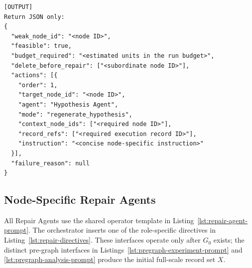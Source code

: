 \begin{lstlisting}
[OUTPUT]
Return JSON only:
{
  "weak_node_id": "<node ID>",
  "feasible": true,
  "budget_required": "<estimated units in the run budget>",
  "delete_before_repair": ["<subordinate node ID>"],
  "actions": [{
    "order": 1,
    "target_node_id": "<node ID>",
    "agent": "Hypothesis Agent",
    "mode": "regenerate_hypothesis",
    "context_node_ids": ["<required node ID>"],
    "record_refs": ["<required execution record ID>"],
    "instruction": "<concise node-specific instruction>"
  }],
  "failure_reason": null
}
\end{lstlisting}
\promptlistingend

\subsection{Node-Specific Repair Agents}

All Repair Agents use the shared operator template in
Listing~\ref{lst:repair-agent-prompt}. The orchestrator inserts one of the
role-specific directives in Listing~\ref{lst:repair-directives}. These
interfaces operate only after $G_0$ exists; the distinct pre-graph interfaces
in Listings~\ref{lst:pregraph-experiment-prompt} and
\ref{lst:pregraph-analysis-prompt} produce the initial full-scale record set
$X$.

